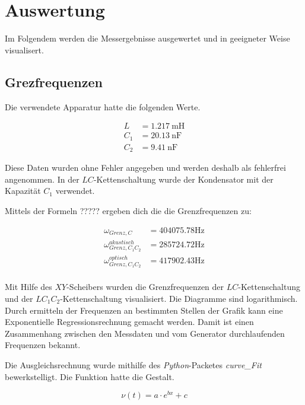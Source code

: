 %

%

\section{Auswertung}

Im Folgendem werden die Messergebnisse ausgewertet und in geeigneter
Weise visualisert.

\subsection{Grezfrequenzen}

Die verwendete Apparatur hatte die folgenden Werte.

\begin{align}
  \label{L}
  L &= \SI{1,217}{\milli\henry}\\
  \label{C1}
  C_1 &= \SI{20,13}{\nano\farad}\\
  \label{C2}
  C_2 &= \SI{9,41}{\nano\farad}
\end{align}

Diese Daten wurden ohne Fehler angegeben und werden deshalb als fehlerfrei
angenommen. In der $LC$-Kettenschaltung wurde der Kondensator mit der
Kapazität $C_1$ verwendet.

Mittels der Formeln ????? ergeben dich die die Grenzfrequenzen zu:

\begin{align*}
  \omega_{Grenz,C} &= \num{404075,78}\si{\hertz}\\
  \omega_{Grenz,C_1C_2}^{akustisch} &= \num{285724,72}\si{\hertz}\\
  \omega_{Grenz,C_1C_2}^{optisch} &= \num{417902,43}\si{\hertz}\\
\end{align*}

Mit Hilfe des $XY$-Scheibers wurden die Grenzfrequenzen der $LC$-Kettenschaltung
und der $LC_1C_2$-Kettenschaltung visualisiert. Die Diagramme sind
logarithmisch. Durch ermitteln der Frequenzen an bestimmten Stellen der
Grafik kann eine Exponentielle Regressionsrechnung gemacht werden.
Damit ist einen Zusammenhang zwischen den Messdaten und vom Generator durchlaufenden
Frequenzen bekannt.

Die Ausgleichsrechnung wurde mithilfe des \emph{Python}-Packetes
\emph{curve\_Fit} bewerkstelligt. Die Funktion hatte die Gestalt.

\begin{equation}
  \nu(t) = a\cdot e^{bx}+c
\end{equation}

